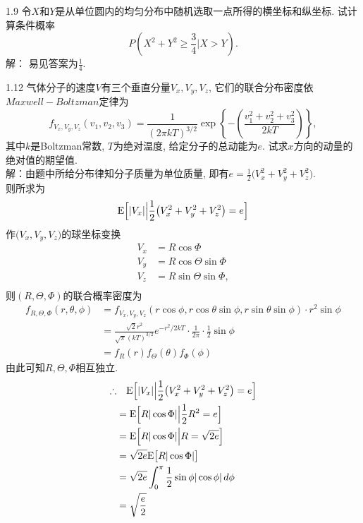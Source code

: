 1.9 令$X$和$Y$是从单位圆内的均匀分布中随机选取一点所得的横坐标和纵坐标. 试计算条件概率
	\[
	P\left(X^2+Y^2 \geqslant \frac{3}{4} \bigg| X > Y\right).
	\]
解：
易见答案为$\frac{1}{4}$.






1.12 气体分子的速度$V$有三个垂直分量$V_x, V_y, V_z$, 它们的联合分布密度依$Maxwell-Boltzman$定律为
	\[
	f_{V_x, V_y, V_z}(v_1, v_2, v_3) = \frac{1}{(2\pi kT)^{3/2}}\exp\left\{-\left(\frac{v^2_1+v^2_2+v^2_3}{2kT}\right)\right\},
	\]
	其中$k$是Boltzman常数, $T$为绝对温度, 给定分子的总动能为$e$. 试求$x$方向的动量的绝对值的期望值.\\
解：由题中所给分布律知分子质量为单位质量, 即有$e = \frac{1}{2}\big(V^2_x+V^2_y+V^2_z\big)$.\\
则所求为
\[
\mathrm{E} \Big[|V_x|\Big|\frac{1}{2}\big(V^2_x+V^2_y+V^2_z\big) = e\Big]
\]
作$\big(V_x, V_y, V_z\big)$的球坐标变换
\[
\begin{split}
V_x & = R\cos\Phi\\
V_y & = R\cos\Theta\sin\Phi\\
V_z & = R\sin\Theta\sin\Phi,\\
\end{split}
\]
则$(R,\Theta,\Phi)$的联合概率密度为
\[
\begin{split}
f_{R,\Theta,\Phi}(r,\theta,\phi) & = f_{V_x, V_y, V_z}(r\cos\phi,r\cos\theta\sin\phi,r\sin\theta\sin\phi)\cdot r^2\sin\phi\\
								& = \frac{\sqrt{2}r^2}{\sqrt{\pi}(kT)^{3/2}}e^{-r^2/2kT}\cdot \frac{1}{2\pi}\cdot \frac{1}{2}\sin\phi\\
								& = f_R(r)f_\Theta(\theta)f_\Phi(\phi)
\end{split}
\]
由此可知$R,\Theta,\Phi$相互独立.\\
\[
\begin{split}
\therefore & \quad \mathrm{E}\Big[|V_x|\Big|\frac{1}{2}\big(V^2_x+V^2_y+V^2_z\big) = e\Big]\\
		& = \mathrm{E}\Big[R|\cos\Phi|\Big|\frac{1}{2}R^2 = e\Big]\\
		& = \mathrm{E}\Big[R|\cos\Phi|\Big|R = \sqrt{2e}\Big]\\
		& = \sqrt{2e}\mathrm{E}\big[R|\cos\Phi|\big]\\
		& = \sqrt{2e}\int^\pi_0\frac{1}{2}\sin\phi|\cos\phi|\,d\phi\\
		& = \sqrt{\frac{e}{2}}
\end{split}
\]


